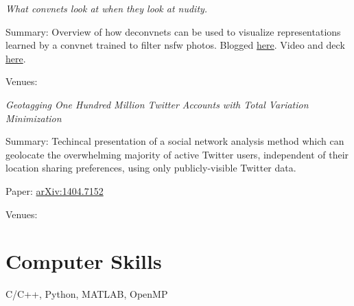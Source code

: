 \documentclass[margin,line]{res}
\newenvironment{list1}{
  \begin{list}{\ding{113}}{%
      \setlength{\itemsep}{0in}
      \setlength{\parsep}{0in} \setlength{\parskip}{0in}
      \setlength{\topsep}{0in} \setlength{\partopsep}{0in} 
      \setlength{\leftmargin}{0.17in}}}{\end{list}}
\begin{document}
\begin{resume}
{\it What convnets look at when they look at nudity.} 
\begin{list1}
\item [] Summary: Overview of how deconvnets can be used to visualize representations learned by a convnet trained to filter nsfw photos. Blogged \href{http://blog.clarifai.com/what-convolutional-neural-networks-see-at-when-they-see-nudity/}{here}. Video and deck \href{http://ryancompton.net/2016/12/06/my-talk-at-the-nyc-machine-learning-meetup/}{here}.
\item [] Venues:
\end{list1}

{\it Geotagging One Hundred Million Twitter Accounts with Total Variation Minimization} 
\begin{list1}
\item [] Summary: Techincal presentation of a social network analysis method which can geolocate the overwhelming majority of active Twitter users, independent of their location sharing preferences, using only publicly-visible Twitter data.
\item [] Paper: \href{https://arxiv.org/abs/1404.7152}{arXiv:1404.7152}
\item [] Venues:
\end{list1}

\section{\sc Computer Skills}
C/C++, Python, MATLAB, OpenMP



\end{resume}
\end{document}
